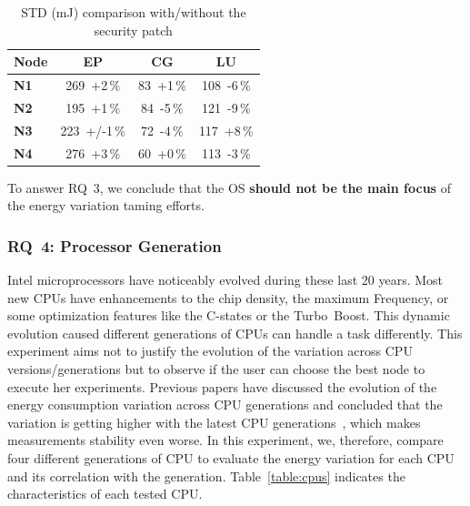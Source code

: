 \begin{table}[h!]
    \centering
    \caption{STD (mJ) comparison with/without the security patch}
    \label{table:meltdown}
    \small
    \begin{tabular}{|l|c|c|c|}
        \hline
        \textbf{Node} & \textbf{\sf EP} & \textbf{\sf CG} & \textbf{\sf LU} \\
        \hline
        \hline
        \textbf{N1}   & 269~+2\,\%      & 83~+1\,\%       & 108~-6\,\%      \\
        \hline
        \textbf{N2}   & 195~+1\,\%      & 84~-5\,\%       & 121~-9\,\%      \\
        \hline
        \textbf{N3}   & 223~+/-1\,\%    & 72~-4\,\%       & 117~+8\,\%      \\
        \hline
        \textbf{N4}   & 276~+3\,\%      & 60~+0\,\%       & 113~-3\,\%      \\
        \hline
    \end{tabular}
\end{table}

\begin{mdframed}[skipabove=\topsep,skipbelow=\topsep]
    To answer \textsc{RQ~3}, we conclude that the OS \textbf{should not be the main focus} of the energy variation taming efforts.
\end{mdframed}

\subsubsection{\textsc{RQ}~4: Processor Generation}
Intel microprocessors have noticeably evolved during these last 20 years.
Most new CPUs have enhancements to the chip density, the maximum Frequency, or some optimization features like the C-states or the Turbo~Boost.
This dynamic evolution caused different generations of CPUs can handle a task differently.
This experiment aims not to justify the evolution of the variation across CPU versions/generations but to observe if the user can choose the best node to execute her experiments.
Previous papers have discussed the evolution of the energy consumption variation across CPU generations and concluded that the variation is getting higher with the latest CPU generations~\cite{wang_experimental_nodate,marathe_empirical_2017_m}, which makes measurements stability even worse.
In this experiment, we, therefore, compare four different generations of CPU to evaluate the energy variation for each CPU and its correlation with the generation.
Table~\ref{table:cpus} indicates the characteristics of each tested CPU.

